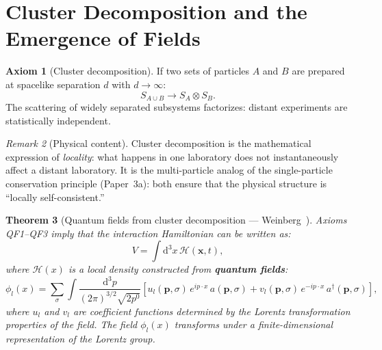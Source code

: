 \documentclass[12pt]{article}
\theoremstyle{plain}
\newtheorem{theorem}{Theorem}[section]
\theoremstyle{definition}
\newtheorem{axiom}[theorem]{Axiom}
\theoremstyle{remark}
\newtheorem{remark}[theorem]{Remark}
\newcommand{\dd}{\mathrm{d}}
\begin{document}
\section{Cluster Decomposition and the Emergence of Fields}
\label{sec:cluster}

\begin{axiom}[Cluster decomposition]\label{ax:QF3}
If two sets of particles $A$ and $B$ are prepared at spacelike separation $d$ with $d \to \infty$:
\begin{equation}\label{eq:cluster}
S_{A \cup B} \to S_A \otimes S_B.
\end{equation}
The scattering of widely separated subsystems factorizes: distant experiments are statistically independent.
\end{axiom}

\begin{remark}[Physical content]
Cluster decomposition is the mathematical expression of \emph{locality}: what happens in one laboratory does not instantaneously affect a distant laboratory. It is the multi-particle analog of the single-particle conservation principle (Paper~3a): both ensure that the physical structure is ``locally self-consistent.''
\end{remark}

\begin{theorem}[Quantum fields from cluster decomposition --- Weinberg~\cite{weinberg1995}]\label{thm:fields-from-cluster}
Axioms QF1--QF3 imply that the interaction Hamiltonian can be written as:
\begin{equation}\label{eq:H-local}
V = \int \dd^3x\,\mathcal{H}(\mathbf{x}, t),
\end{equation}
where $\mathcal{H}(x)$ is a \emph{local} density constructed from \textbf{quantum fields}:
\begin{equation}\label{eq:field}
\phi_l(x) = \sum_\sigma \int \frac{\dd^3p}{(2\pi)^{3/2}\sqrt{2p^0}} \left[u_l(\mathbf{p}, \sigma)\,e^{ip\cdot x}\,a(\mathbf{p}, \sigma) + v_l(\mathbf{p}, \sigma)\,e^{-ip\cdot x}\,a^\dagger(\mathbf{p}, \sigma)\right],
\end{equation}
where $u_l$ and $v_l$ are coefficient functions determined by the Lorentz transformation properties of the field. The field $\phi_l(x)$ transforms under a finite-dimensional representation of the Lorentz group.
\end{theorem}
\end{document}
